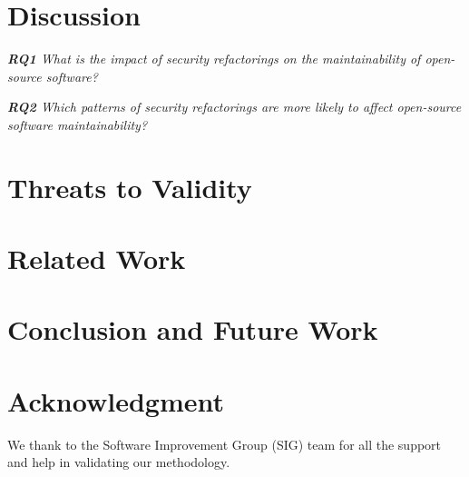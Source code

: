 \documentclass[10pt,conference]{IEEEtran}
\begin{document}
\section{Discussion}\label{sec:discussion}


\begin{framed}
\textit{\textbf{RQ1} What is the impact of security refactorings on the maintainability of open-source software?}
\end{framed}


\begin{framed}
\textit{\textbf{RQ2} Which patterns of security refactorings are more likely to affect open-source software maintainability?}
\end{framed}



\section{Threats to Validity}\label{sec:threats}



\section{Related Work}\label{sec:rw}




\section{Conclusion and Future Work}\label{sec:conclusions}



\section*{Acknowledgment}\label{sec:ack}


We thank to the Software Improvement Group (SIG) team for all the support and help in validating our methodology.

{
 
  
}
\end{document}
